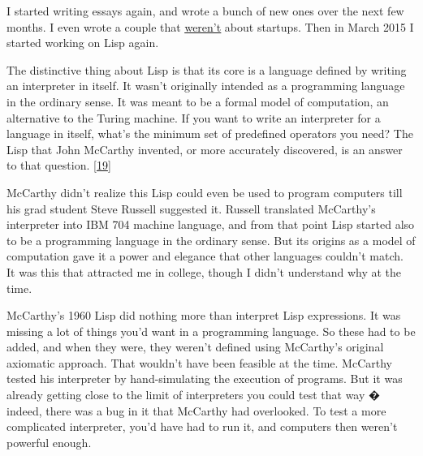 I started writing essays
                  again, and wrote a bunch of new ones over the next few months.
                  I even wrote a couple that
                  \href{http://www.paulgraham.com/know.html}{\underline{weren't}} about startups. Then in
                  March 2015 I started working on Lisp again.

The
                  distinctive thing about Lisp is that its core is a language
                  defined by writing an interpreter in itself. It wasn't
                  originally intended as a programming language in the ordinary
                  sense. It was meant to be a formal model of computation, an
                  alternative to the Turing machine. If you want to write an
                  interpreter for a language in itself, what's the minimum set
                  of predefined operators you need? The Lisp that John McCarthy
                  invented, or more accurately discovered, is an answer to that
                  question.
                  [\href{\#f19n}{19}]

McCarthy didn't realize this Lisp could even be
                  used to program computers till his grad student Steve Russell
                  suggested it. Russell translated McCarthy's interpreter into
                  IBM 704 machine language, and from that point Lisp started
                  also to be a programming language in the ordinary sense. But
                  its origins as a model of computation gave it a power and
                  elegance that other languages couldn't match. It was this that
                  attracted me in college, though I didn't understand why at the
                  time.

McCarthy's 1960 Lisp did nothing more than
                  interpret Lisp expressions. It was missing a lot of things
                  you'd want in a programming language. So these had to be
                  added, and when they were, they weren't defined using
                  McCarthy's original axiomatic approach. That wouldn't have
                  been feasible at the time. McCarthy tested his interpreter by
                  hand-simulating the execution of programs. But it was already
                  getting close to the limit of interpreters you could test that
                  way � indeed, there was a bug in it that McCarthy had
                  overlooked. To test a more complicated interpreter, you'd have
                  had to run it, and computers then weren't powerful enough.


